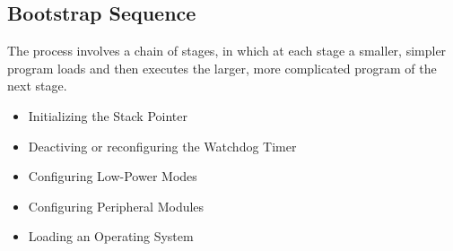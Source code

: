 \subsection{Bootstrap Sequence}
 The process involves a chain of stages, in which at each stage a smaller, simpler program loads and then executes the larger, more complicated program of the next stage.\\
\begin{itemize}
	\item Initializing the Stack Pointer
	\item Deactiving or reconfiguring the Watchdog Timer
	\item Configuring Low-Power Modes
	\item Configuring Peripheral Modules
	\item Loading an Operating System
\end{itemize}
\clearpage
\pagebreak